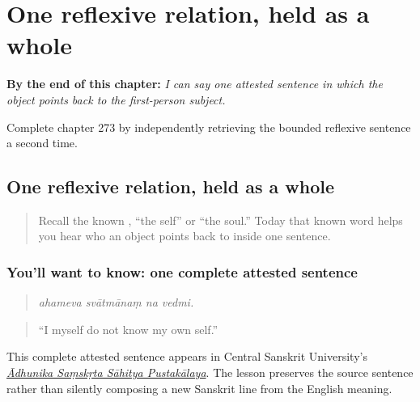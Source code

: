 
\chapter{One reflexive relation, held as a whole}
\label{ch:sa-bounded-reflexive}

\begin{chapteropening}
\textbf{By the end of this chapter:} \emph{I can say one attested sentence in which the object points back to the first-person subject.}

Complete chapter 273 by independently retrieving the bounded reflexive sentence a second time.
\end{chapteropening}

\section[\texorpdfstring{\sk{अहमेव} \sk{स्वात्मानं} \sk{न} … (ahameva …)}{अहमेव स्वात्मानं न … (ahameva …)}]{One reflexive relation, held as a whole}

\label{lesson:SA-C273-meet-one-reflexive}



\begin{quote}
Recall the known , “the self” or “the soul.” Today that known word helps you hear who an object points back to inside one sentence.
\end{quote}

\subsection*{You'll want to know: one complete attested sentence}
\begin{quote}
\textbf{   }
\end{quote}

\begin{quote}
\emph{ahameva svātmānaṃ na vedmi.}
\end{quote}

\begin{quote}
“I myself do not know my own self.”
\end{quote}

This complete attested sentence appears in Central Sanskrit University's \href{https://www.sanskrit.nic.in/ASSP/Vikramcharitam/6frame7.htm}{\emph{Ādhunika Saṃskṛta Sāhitya Pustakālaya}}. The lesson preserves the source sentence rather than silently composing a new Sanskrit line from the English meaning.

